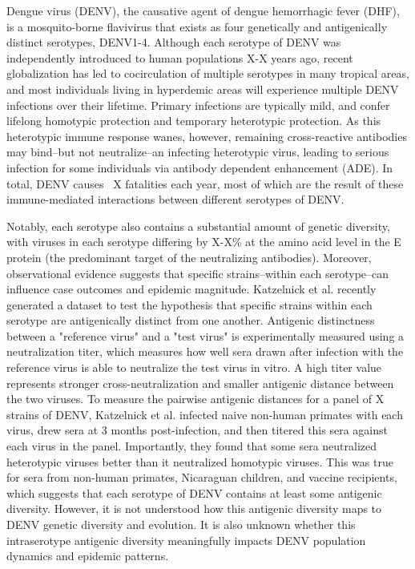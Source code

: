 \documentclass[11pt,oneside,letterpaper]{article}
\begin{document}
Dengue virus (DENV), the causative agent of dengue hemorrhagic fever (DHF), is a mosquito-borne flavivirus that exists as four genetically and antigenically distinct serotypes, DENV1-4.
Although each serotype of DENV was independently introduced to human populations X-X years ago, recent globalization has led to cocirculation of multiple serotypes in many tropical areas, and most individuals living in hyperdemic areas will experience multiple DENV infections over their lifetime.
Primary infections are typically mild, and confer lifelong homotypic protection and temporary heterotypic protection.
As this heterotypic immune response wanes, however, remaining cross-reactive antibodies may bind--but not neutralize--an infecting heterotypic virus, leading to serious infection for some individuals via antibody dependent enhancement (ADE).
In total, DENV causes ~X fatalities each year, most of which are the result of these immune-mediated interactions between different serotypes of DENV.

Notably, each serotype also contains a substantial amount of genetic diversity, with viruses in each serotype differing by X-X\% at the amino acid level in the E protein (the predominant target of the neutralizing antibodies).
Moreover, observational evidence suggests that specific strains--within each serotype--can influence case outcomes and epidemic magnitude.
Katzelnick et al. recently generated a dataset to test the hypothesis that specific strains within each serotype are antigenically distinct from one another.
Antigenic distinctness between a "reference virus" and a "test virus" is experimentally measured using a neutralization titer, which measures how well sera drawn after infection with the reference virus is able to neutralize the test virus in vitro.
A high titer value represents stronger cross-neutralization and smaller antigenic distance between the two viruses.
To measure the pairwise antigenic distances for a panel of X strains of DENV, Katzelnick et al. infected naive non-human primates with each virus, drew sera at 3 months post-infection, and then titered this sera against each virus in the panel.
Importantly, they found that some sera neutralized heterotypic viruses better than it neutralized homotypic viruses.
This was true for sera from non-human primates, Nicaraguan children, and vaccine recipients, which suggests that each serotype of DENV contains at least some antigenic diversity.
However, it is not understood how this antigenic diversity maps to DENV genetic diversity and evolution.
It is also unknown whether this intraserotype antigenic diversity meaningfully impacts DENV population dynamics and epidemic patterns.
\end{document}
